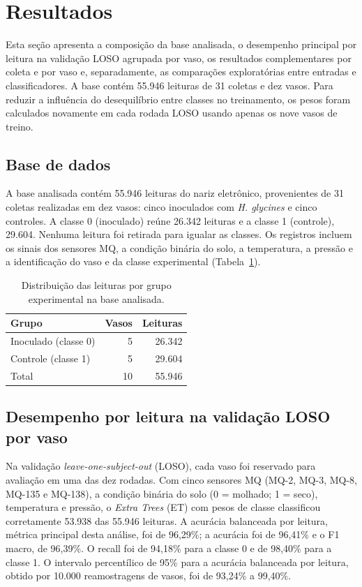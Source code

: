 \section{Resultados}
\label{results}

Esta seção apresenta a composição da base analisada, o desempenho principal por leitura na validação LOSO agrupada por vaso, os resultados complementares por coleta e por vaso e, separadamente, as comparações exploratórias entre entradas e classificadores. A base contém 55.946 leituras de 31 coletas e dez vasos. Para reduzir a influência do desequilíbrio entre classes no treinamento, os pesos foram calculados novamente em cada rodada LOSO usando apenas os nove vasos de treino.

\subsection{Base de dados}
\label{subsec:res_base}

A base analisada contém 55.946 leituras do nariz eletrônico, provenientes de 31 coletas realizadas em dez vasos: cinco inoculados com \textit{H. glycines} e cinco controles. A classe 0 (inoculado) reúne 26.342 leituras e a classe 1 (controle), 29.604. Nenhuma leitura foi retirada para igualar as classes. Os registros incluem os sinais dos sensores MQ, a condição binária do solo, a temperatura, a pressão e a identificação do vaso e da classe experimental (Tabela~\ref{tab:base_dados}).

\begin{table}[H]
\centering
\footnotesize
\caption{Distribuição das leituras por grupo experimental na base analisada.}
\label{tab:base_dados}
\begin{tabular}{lrr}
\toprule
Grupo & Vasos & Leituras \\
\midrule
Inoculado (classe 0) & 5 & 26.342 \\
Controle (classe 1) & 5 & 29.604 \\
\midrule
Total & 10 & 55.946 \\
\bottomrule
\end{tabular}
\end{table}

\subsection{Desempenho por leitura na validação LOSO por vaso}
\label{subsec:res_loso}

Na validação \textit{leave-one-subject-out} (LOSO), cada vaso foi reservado para avaliação em uma das dez rodadas. Com cinco sensores MQ (MQ-2, MQ-3, MQ-8, MQ-135 e MQ-138), a condição binária do solo (0 = molhado; 1 = seco), temperatura e pressão, o \textit{Extra Trees} (ET) com pesos de classe classificou corretamente 53.938 das 55.946 leituras. A acurácia balanceada por leitura, métrica principal desta análise, foi de 96,29\%; a acurácia foi de 96,41\% e o F1 macro, de 96,39\%. O recall foi de 94,18\% para a classe 0 e de 98,40\% para a classe 1. O intervalo percentílico de 95\% para a acurácia balanceada por leitura, obtido por 10.000 reamostragens de vasos, foi de 93,24\% a 99,40\%.

